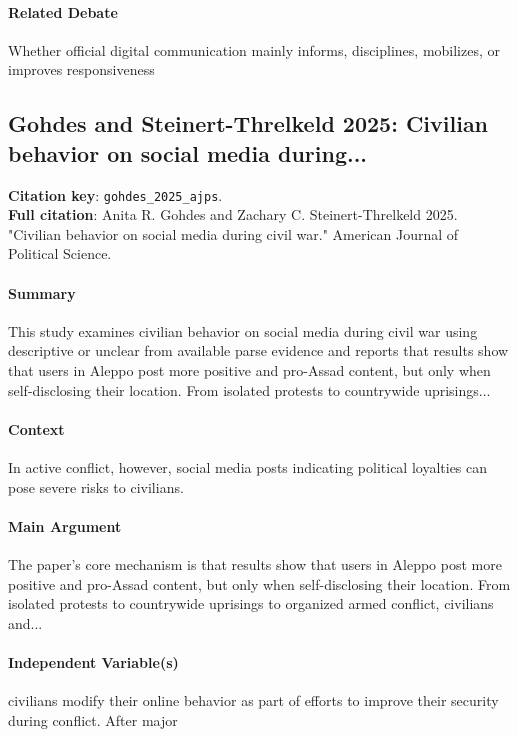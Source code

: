 \documentclass[12pt]{article}
\begin{document}
\paragraph{Related Debate} Whether official digital communication mainly informs, disciplines, mobilizes, or improves responsiveness


\subsection{Gohdes and Steinert-Threlkeld 2025: Civilian behavior on social media during...}
\textbf{Citation key}: \texttt{gohdes\_2025\_ajps}.\\
\textbf{Full citation}: Anita R. Gohdes and Zachary C. Steinert-Threlkeld 2025. "Civilian behavior on social media during civil war." American Journal of Political Science.

\paragraph{Summary} This study examines civilian behavior on social media during civil war using descriptive or unclear from available parse evidence and reports that results show that users in Aleppo post more positive and pro-Assad content, but only when self-disclosing their location. From isolated protests to countrywide uprisings...

\paragraph{Context} In active conflict, however, social media posts indicating political loyalties can pose severe risks to civilians.

\paragraph{Main Argument} The paper's core mechanism is that results show that users in Aleppo post more positive and pro-Assad content, but only when self-disclosing their location. From isolated protests to countrywide uprisings to organized armed conflict, civilians and...

\paragraph{Independent Variable(s)} civilians modify their online behavior as part of efforts to improve their security during conflict. After major
\end{document}
